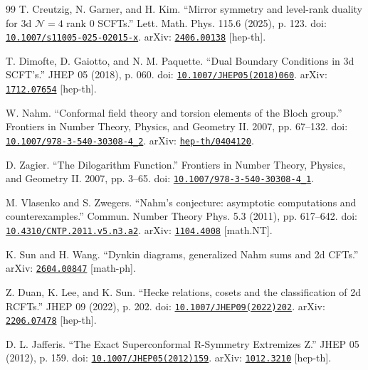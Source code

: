 \documentclass[11pt,a4paper]{article}
\numberwithin{equation}{section}
\begin{document}
\begin{thebibliography}{99}
T. Creutzig, N. Garner, and H. Kim. ``Mirror symmetry and level-rank duality for 3d $ \mathcal{N}=4 $ rank 0 SCFTs.'' Lett. Math. Phys. 115.6 (2025), p. 123. doi: \href{https://doi.org/10.1007/s11005-025-02015-x}{\nolinkurl{10.1007/s11005-025-02015-x}}. arXiv: \href{https://arxiv.org/abs/2406.00138}{\nolinkurl{2406.00138}} [hep-th].

T. Dimofte, D. Gaiotto, and N. M. Paquette. ``Dual Boundary Conditions in 3d SCFT's.'' JHEP 05 (2018), p. 060. doi: \href{https://doi.org/10.1007/JHEP05(2018)060}{\nolinkurl{10.1007/JHEP05(2018)060}}. arXiv: \href{https://arxiv.org/abs/1712.07654}{\nolinkurl{1712.07654}} [hep-th].

W. Nahm. ``Conformal field theory and torsion elements of the Bloch group.'' Frontiers in Number Theory, Physics, and Geometry II. 2007, pp. 67--132. doi: \href{https://doi.org/10.1007/978-3-540-30308-4_2}{\nolinkurl{10.1007/978-3-540-30308-4_2}}. arXiv: \href{https://arxiv.org/abs/hep-th/0404120}{\nolinkurl{hep-th/0404120}}.

D. Zagier. ``The Dilogarithm Function.'' Frontiers in Number Theory, Physics, and Geometry II. 2007, pp. 3--65. doi: \href{https://doi.org/10.1007/978-3-540-30308-4_1}{\nolinkurl{10.1007/978-3-540-30308-4_1}}.

M. Vlasenko and S. Zwegers. ``Nahm's conjecture: asymptotic computations and counterexamples.'' Commun. Number Theory Phys. 5.3 (2011), pp. 617--642. doi: \href{https://doi.org/10.4310/CNTP.2011.v5.n3.a2}{\nolinkurl{10.4310/CNTP.2011.v5.n3.a2}}. arXiv: \href{https://arxiv.org/abs/1104.4008}{\nolinkurl{1104.4008}} [math.NT].

K. Sun and H. Wang. ``Dynkin diagrams, generalized Nahm sums and 2d CFTs.'' arXiv: \href{https://arxiv.org/abs/2604.00847}{\nolinkurl{2604.00847}} [math-ph].

Z. Duan, K. Lee, and K. Sun. ``Hecke relations, cosets and the classification of 2d RCFTs.'' JHEP 09 (2022), p. 202. doi: \href{https://doi.org/10.1007/JHEP09(2022)202}{\nolinkurl{10.1007/JHEP09(2022)202}}. arXiv: \href{https://arxiv.org/abs/2206.07478}{\nolinkurl{2206.07478}} [hep-th].

D. L. Jafferis. ``The Exact Superconformal R-Symmetry Extremizes Z.'' JHEP 05 (2012), p. 159. doi: \href{https://doi.org/10.1007/JHEP05(2012)159}{\nolinkurl{10.1007/JHEP05(2012)159}}. arXiv: \href{https://arxiv.org/abs/1012.3210}{\nolinkurl{1012.3210}} [hep-th].


\end{thebibliography}
\end{document}
